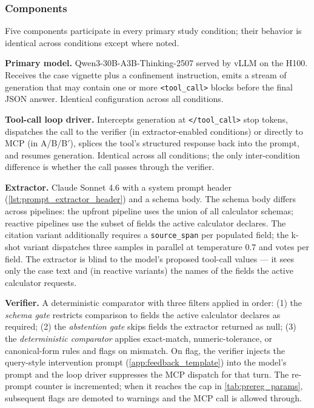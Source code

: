 \subsubsection{Components}

Five components participate in every primary study condition; their
behavior is identical across conditions except where noted.

\textbf{Primary model.} Qwen3-30B-A3B-Thinking-2507 served by vLLM
on the H100. Receives the case vignette plus a confinement
instruction, emits a stream of generation that may contain one or
more \verb|<tool_call>| blocks before the final JSON answer.
Identical configuration across all conditions.

\textbf{Tool-call loop driver.} Intercepts generation at
\verb|</tool_call>| stop tokens, dispatches the call to the verifier
(in extractor-enabled conditions) or directly to MCP (in A/B/B$'$),
splices the tool's structured response back into the prompt, and
resumes generation. Identical across all conditions; the only
inter-condition difference is whether the call passes through the
verifier.

\textbf{Extractor.} Claude Sonnet 4.6 with a system prompt header
(\cref{lst:prompt_extractor_header}) and a schema body. The schema
body differs across pipelines: the upfront pipeline uses the union
of all calculator schemas; reactive pipelines use the subset of
fields the active calculator declares. The citation variant
additionally requires a \texttt{source\_span} per populated field;
the k-shot variant dispatches three samples in parallel at
temperature $0.7$ and votes per field. The extractor is blind to the
model's proposed tool-call values --- it sees only the case text
and (in reactive variants) the names of the fields the active
calculator requests.

\textbf{Verifier.} A deterministic comparator with three filters
applied in order: (1) the \emph{schema gate} restricts comparison
to fields the active calculator declares as required;
(2) the \emph{abstention gate} skips fields the extractor returned as
null; (3) the \emph{deterministic comparator} applies exact-match,
numeric-tolerance, or canonical-form rules and flags on mismatch.
On flag, the verifier injects the query-style intervention prompt
(\cref{app:feedback_template}) into the model's prompt and the
loop driver suppresses the MCP dispatch for that turn. The
re-prompt counter is incremented; when it reaches the cap in
\cref{tab:prereg_params}, subsequent flags are demoted to warnings
and the MCP call is allowed through.

